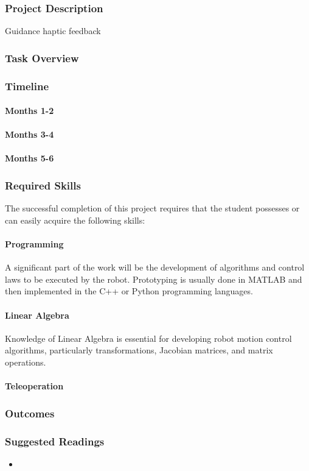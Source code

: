 
\subsubsection{Project Description}

Guidance
haptic feedback


\subsubsection{Task Overview}

\subsubsection{Timeline}
\paragraph{Months 1-2}

\paragraph{Months 3-4}

\paragraph{Months 5-6}

\subsubsection{Required Skills}
The successful completion of this project requires that the student possesses or can easily acquire the following skills: 
\paragraph{Programming} A significant part of the work will be the development of algorithms and control laws to be executed by the robot. Prototyping is usually done in MATLAB and then implemented in the C++ or Python programming languages.
\paragraph{Linear Algebra} Knowledge of Linear Algebra is essential for developing robot motion control algorithms, particularly  transformations, Jacobian matrices, and matrix operations.
\paragraph{Teleoperation}

\subsubsection{Outcomes}

\subsubsection{Suggested Readings}
\begin{itemize}
	\item	{}
	
\end{itemize}


